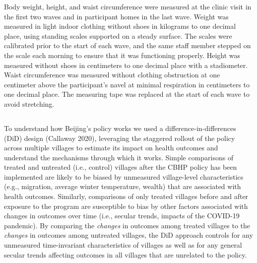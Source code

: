 \documentclass[
  letterpaper,
  DIV=11,
  numbers=noendperiod]{scrartcl}
\providecommand{\DIFadd}[1]{{\protect\color{blue}\uwave{#1}}} %
\providecommand{\DIFaddbegin}{} %
\providecommand{\DIFaddend}{} %
\providecommand{\DIFdelbegin}{} %
\providecommand{\DIFdelend}{} %
\newcommand{\DIFscaledelfig}{0.5}
\newlength{\DIFdelgraphicswidth} %
\newlength{\DIFdelgraphicsheight} %
\newcommand{\DIFaddincludegraphics}[2][]{{\color{blue}\fbox{\DIFOincludegraphics[#1]{#2}}}} %
\newcommand{\DIFdelincludegraphics}[2][]{%
\sbox{\DIFdelgraphicsbox}{\DIFOincludegraphics[#1]{#2}}%
\settoboxwidth{\DIFdelgraphicswidth}{\DIFdelgraphicsbox} %
\settoboxtotalheight{\DIFdelgraphicsheight}{\DIFdelgraphicsbox} %
\scalebox{\DIFscaledelfig}{%
\parbox[b]{\DIFdelgraphicswidth}{\usebox{\DIFdelgraphicsbox}\\[-\baselineskip] \rule{\DIFdelgraphicswidth}{0em}}\llap{\resizebox{\DIFdelgraphicswidth}{\DIFdelgraphicsheight}{%
\setlength{\unitlength}{\DIFdelgraphicswidth}%
\begin{picture}(1,1)%
\thicklines\linethickness{2pt} %
{\color[rgb]{1,0,0}\put(0,0){\framebox(1,1){}}}%
{\color[rgb]{1,0,0}\put(0,0){\line( 1,1){1}}}%
{\color[rgb]{1,0,0}\put(0,1){\line(1,-1){1}}}%
\end{picture}%
}\hspace*{3pt}}} %
} %
\DeclareRobustCommand{\DIFaddbegin}{\DIFOaddbegin \let\includegraphics\DIFaddincludegraphics} %
\DeclareRobustCommand{\DIFaddend}{\DIFOaddend \let\includegraphics\DIFOincludegraphics} %
\DeclareRobustCommand{\DIFdelbegin}{\DIFOdelbegin \let\includegraphics\DIFdelincludegraphics} %
\DeclareRobustCommand{\DIFdelend}{\DIFOaddend \let\includegraphics\DIFOincludegraphics} %
\begin{document}
Body weight, height, and waist circumference were measured at the clinic
visit in the first two waves and in participant homes in the last wave.
Weight was measured in light indoor clothing without shoes in kilograms
to one decimal place, using standing scales supported on a steady
surface. The scales were calibrated prior to the start of each wave, and
the same staff member stepped on the scale each morning to ensure that
it was functioning properly. Height was measured without shoes in
centimeters to one decimal place with a stadiometer. Waist circumference
was measured without clothing obstruction at one centimeter above the
participant's navel at minimal respiration in centimeters to one decimal
place. The measuring tape was replaced at the start of each wave to
avoid stretching.

\DIFdelbegin %
\DIFdelend \DIFaddbegin \subsection{\DIFadd{Measuring policy impacts}}\label{measuring-policy-impacts}
\DIFaddend 

To understand how Beijing's policy works we used a
difference-in-differences (DiD) design (Callaway 2020), leveraging the
staggered rollout of the policy across multiple villages to estimate its
impact on health outcomes and understand the mechanisms through which it
works. Simple comparisons of treated and untreated (i.e., control)
villages after the CBHP policy has been implemented are likely to be
biased by unmeasured village-level characteristics (e.g., migration,
average winter temperature, wealth) that are associated with health
outcomes. Similarly, comparisons of only treated villages before and
after exposure to the program are susceptible to bias by other factors
associated with changes in outcomes over time (i.e., secular trends,
impacts of the COVID-19 pandemic). By comparing the \emph{changes} in
outcomes among treated villages to the \emph{changes} in outcomes among
untreated villages, the DiD approach controls for any unmeasured
time-invariant characteristics of villages as well as for any general
secular trends affecting outcomes in all villages that are unrelated to
the policy.
\end{document}
